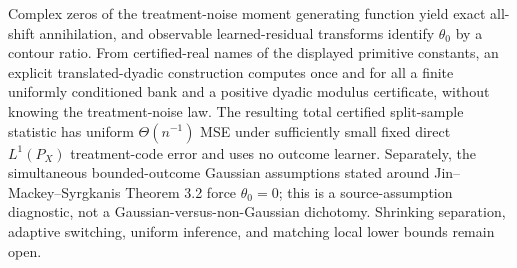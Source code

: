 Complex zeros of the treatment-noise moment generating function yield exact all-shift annihilation, and observable learned-residual transforms identify \(\theta_0\) by a contour ratio.  From certified-real names of the displayed primitive constants, an explicit translated-dyadic construction computes once and for all a finite uniformly conditioned bank and a positive dyadic modulus certificate, without knowing the treatment-noise law.  The resulting total certified split-sample statistic has uniform \(\Theta(n^{-1})\) MSE under sufficiently small fixed direct \(L^1(P_X)\) treatment-code error and uses no outcome learner.  Separately, the simultaneous bounded-outcome Gaussian assumptions stated around Jin--Mackey--Syrgkanis Theorem 3.2 force \(\theta_0=0\); this is a source-assumption diagnostic, not a Gaussian-versus-non-Gaussian dichotomy.  Shrinking separation, adaptive switching, uniform inference, and matching local lower bounds remain open.